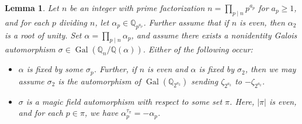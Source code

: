 \documentclass[12pt]{amsart}
\newtheorem{lemma}[theorem]{Lemma}
\theoremstyle{definition}
\newcommand{\Q}{\mathbb{Q}}
\DeclareMathOperator{\Gal}{Gal}
\begin{document}
\begin{lemma}\label{L:2:3}
	Let $n$ be an integer with prime factorization $n = \prod_{p \mid n} p^{a_p}$ for $a_p \geq 1$, and for each $p$ dividing $n$, let $\alpha_p \in \Q_{p^{a_p}}$.
	Further assume that if $n$ is even, then $\alpha_2$ is a root of unity. Set $\alpha = \prod_{p \mid n} \alpha_p$, and assume there exists a nonidentity Galois automorphism $\sigma \in \Gal(\Q_n/\Q(\alpha))$. Either of the following occur:
	\begin{itemize}
		\item[(i).] $\alpha$ is fixed by some $\sigma_p$. Further, if $n$ is even and $\alpha$ is fixed by $\sigma_2$, then we may assume $\sigma_2$ is the automorphism of $\Gal(\Q_{2^{a_2}})$ sending $\zeta_{2^{a_2}}$ to $-
		\zeta_{2^{a_2}}$.
		\item[(ii).] $\sigma$ is a magic field automorphism with respect to some set $\pi$. Here, $|\pi|$ is even, and for each $p \in \pi$, we have $\alpha_p^{\tau_\pi} = -\alpha_p$. 
	\end{itemize}

\end{lemma}
\end{document}
